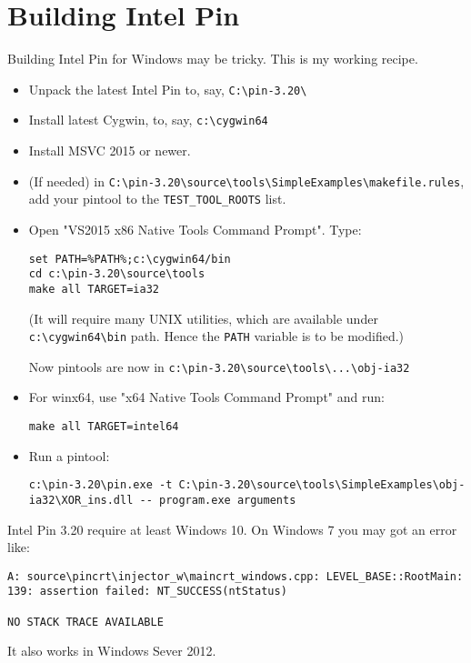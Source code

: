 \section{Building Intel Pin}

Building Intel Pin for Windows may be tricky.
This is my working recipe.

\begin{itemize}

\item Unpack the latest Intel Pin to, say, \verb|C:\pin-3.20\|

\item Install latest Cygwin, to, say, \verb|c:\cygwin64|

\item Install MSVC 2015 or newer.

\item (If needed) in \verb|C:\pin-3.20\source\tools\SimpleExamples\makefile.rules|, add your pintool to the \verb|TEST_TOOL_ROOTS| list.

\item Open "VS2015 x86 Native Tools Command Prompt". Type:

\begin{lstlisting}
set PATH=%PATH%;c:\cygwin64/bin
cd c:\pin-3.20\source\tools
make all TARGET=ia32
\end{lstlisting}

(It will require many UNIX utilities, which are available under \verb|c:\cygwin64\bin| path.
Hence the \verb|PATH| variable is to be modified.)

Now pintools are now in \verb|c:\pin-3.20\source\tools\...\obj-ia32|

\item For winx64, use "x64 Native Tools Command Prompt" and run:

\begin{lstlisting}
make all TARGET=intel64
\end{lstlisting}

\item Run a pintool:

\begin{lstlisting}
c:\pin-3.20\pin.exe -t C:\pin-3.20\source\tools\SimpleExamples\obj-ia32\XOR_ins.dll -- program.exe arguments
\end{lstlisting}

\end{itemize}

Intel Pin 3.20 require at least Windows 10.
On Windows 7 you may got an error like:

\begin{lstlisting}
A: source\pincrt\injector_w\maincrt_windows.cpp: LEVEL_BASE::RootMain: 139: assertion failed: NT_SUCCESS(ntStatus)

NO STACK TRACE AVAILABLE
\end{lstlisting}

It also works in Windows Sever 2012.


